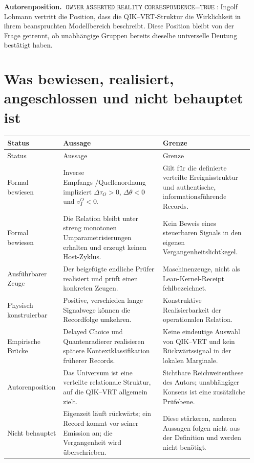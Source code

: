 \documentclass[11pt,a4paper]{article}
\theoremstyle{remark}
\newcommand{\statusbox}[2]{%
  \par\medskip\noindent
  \colorbox{#1}{\parbox{\dimexpr\linewidth-2\fboxsep\relax}{#2}}%
  \par\medskip
}
\begin{document}
\statusbox{QLight}{
  \textbf{Autorenposition.}
  \(\texttt{OWNER\_ASSERTED\_REALITY\_CORRESPONDENCE}=\texttt{TRUE}\):
  Ingolf Lohmann vertritt die Position, dass die QIK--VRT-Struktur die
  Wirklichkeit in ihrem beanspruchten Modellbereich beschreibt. Diese
  Position bleibt von der Frage getrennt, ob unabhängige Gruppen bereits
  dieselbe universelle Deutung bestätigt haben.
}

\section{Was bewiesen, realisiert, angeschlossen und nicht behauptet ist}

\begin{longtable}{p{}p{}p{}}
\toprule
Status & Aussage & Grenze \\
\midrule
\endfirsthead
\toprule
Status & Aussage & Grenze \\
\midrule
\endhead
Formal bewiesen & Inverse Empfangs-/Quellenordnung impliziert
\(\Delta\tau_O>0\), \(\Delta\theta<0\) und \(v_I^O<0\). & Gilt für die
definierte verteilte Ereignisstruktur und authentische, informationsführende
Records. \\
Formal bewiesen & Die Relation bleibt unter streng monotonen
Umparametrisierungen erhalten und erzeugt keinen Host-Zyklus. & Kein Beweis
eines steuerbaren Signals in den eigenen Vergangenheitslichtkegel. \\
Ausführbarer Zeuge & Der beigefügte endliche Prüfer realisiert und
prüft einen konkreten Zeugen. & Maschinenzeuge, nicht als Lean-Kernel-Receipt
fehlbezeichnet. \\
Physisch konstruierbar & Positive, verschieden lange Signalwege
können die Recordfolge umkehren. & Konstruktive Realisierbarkeit der
operationalen Relation. \\
Empirische Brücke & Delayed Choice und Quantenradierer realisieren
spätere Kontextklassifikation früherer Records. & Keine eindeutige Auswahl
von QIK--VRT und kein Rückwärtssignal in der lokalen Marginale. \\
Autorenposition & Das Universum ist eine verteilte relationale
Struktur, auf die QIK--VRT allgemein zielt. & Sichtbare Reichweitenthese des
Autors; unabhängiger Konsens ist eine zusätzliche Prüfebene. \\
Nicht behauptet & Eigenzeit läuft rückwärts; ein Record kommt vor
seiner Emission an; die Vergangenheit wird überschrieben. & Diese stärkeren,
anderen Aussagen folgen nicht aus der Definition und werden nicht benötigt. \\
\bottomrule
\end{longtable}
\end{document}
